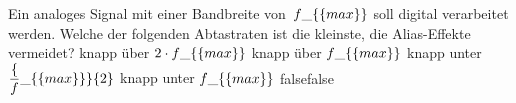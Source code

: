     {Ein analoges Signal mit einer Bandbreite von $f\_\{\textrm\{max\}\}$ soll digital verarbeitet werden. Welche der folgenden Abtastraten ist die kleinste, die Alias-Effekte vermeidet?}
    {knapp über $2 \cdot f\_\{\textrm\{max\}\}$}
    {knapp über $f\_\{\textrm\{max\}\}$}
    {knapp unter $\dfrac\{f\_\{\mathrm\{max\}\}\}\{2\}$}
    {knapp unter $f\_\{\textrm\{max\}\}$}
    {false}{false}